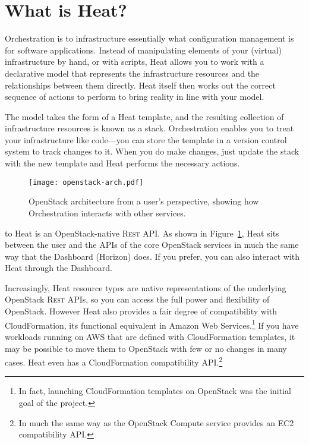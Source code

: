 \section{What is Heat?}

Orchestration is to infrastructure essentially what configuration management is for software applications. Instead of manipulating elements of your (virtual) infrastructure by hand, or with scripts, Heat allows you to work with a declarative model that represents the infrastructure resources and the relationships between them directly. Heat itself then works out the correct sequence of actions to perform to bring reality in line with your model.

The model takes the form of a Heat template, and the resulting collection of infrastructure resources is known as a stack. Orchestration enables you to treat your infrastructure like code---you can store the template in a version control system to track changes to it. When you do make changes, just update the stack with the new template and Heat performs the necessary actions.

\begin{figure}[b!]
\centering
\texttt{[image: openstack-arch.pdf]}
\caption{OpenStack architecture from a user's perspective, showing how Orchestration interacts with other services.}
\label{fig:openstack-arch}
\end{figure}

 to Heat is an OpenStack-native \textsc{Rest} API. As shown in Figure~\ref{fig:openstack-arch}, Heat sits between the user and the APIs of the core OpenStack services in much the same way that the Dashboard (Horizon) does. If you prefer, you can also interact with Heat through the Dashboard.

Increasingly, Heat resource types are native representations of the underlying OpenStack \textsc{Rest} APIs, so you can access the full power and flexibility of OpenStack. However Heat also provides a fair degree of compatibility with CloudFormation, its functional equivalent in Amazon Web Services.\footnote{In fact, launching CloudFormation templates on OpenStack was the initial goal of the project.} If you have workloads running on AWS that are defined with CloudFormation templates, it may be possible to move them to OpenStack with few or no changes in many cases. Heat even has a CloudFormation compatibility API.\footnote{In much the same way as the OpenStack Compute service provides an EC2 compatibility API.}
